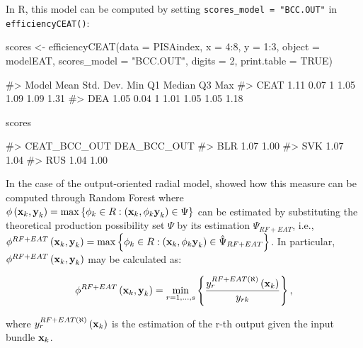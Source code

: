 In R, this model can be computed by setting
\texttt{scores\_model\ =\ "BCC.OUT"} in \texttt{efficiencyCEAT()}:

\begin{Schunk}
\begin{Sinput}
scores <- efficiencyCEAT(data = PISAindex, x = 4:8, y = 1:3, object = modelEAT, 
                         scores_model = "BCC.OUT", digits = 2,
                         print.table = TRUE)
\end{Sinput}
\begin{Soutput}
#>  Model Mean Std. Dev. Min   Q1 Median   Q3  Max
#>   CEAT 1.11      0.07   1 1.05   1.09 1.09 1.31
#>    DEA 1.05      0.04   1 1.01   1.05 1.05 1.18
\end{Soutput}
\begin{Sinput}
scores %>% sample_n(3)
\end{Sinput}
\begin{Soutput}
#>     CEAT_BCC_OUT DEA_BCC_OUT
#> BLR         1.07        1.00
#> SVK         1.07        1.04
#> RUS         1.04        1.00
\end{Soutput}
\end{Schunk}

In the case of the output-oriented radial model, \citet{esteve2021}
showed how this measure can be computed through Random Forest where
\(\phi \left({\it \textbf{x}}_{k} ,{\it \textbf{y}}_{k} \right)=\max \left\{\phi _{k} \in R:\left({\it \textbf{x}}_{k} ,\phi_{k} {\it \textbf{y}}_{k} \right)\in \Psi \right\}\)
can be estimated by substituting the theoretical production possibility
set \(\Psi\) by its estimation \(\hat{\Psi}_{RF+EAT}\), i.e.,
\(\phi ^{RF+EAT} \left({\it \textbf{x}}_{k} ,{\it \textbf{y}}_{k} \right)= \max \left\{\phi _{k} \in R:\left({\it \textbf{x}}_{k} ,\phi _{k} {\it \textbf{y}}_{k} \right)\in \hat{\Psi }_{RF+EAT} \right\}\).
In particular,
\(\phi^{RF+EAT} \left({\it \textbf{x}}_{k} ,{\it \textbf{y}}_{k} \right)\)
may be calculated as:

\begin{equation} \label{(14)} 
\phi^{RF+EAT} \left({\it \textbf{x}}_{k} ,{\it \textbf{y}}_{k} \right)={\mathop{\min }\limits_{r=1,...,s}} \left\{\frac{y_{r}^{RF+EAT\left(\aleph \right)} \left({\it \textbf{x}}_{k} \right)}{y_{rk} } \right\},  
\end{equation}

where
\(y_{r}^{RF+EAT\left(\aleph \right)} \left({\it \textbf{x}}_{k} \right)\)
is the estimation of the r-th output given the input bundle
\({\it \textbf{x}}_{k}\).

